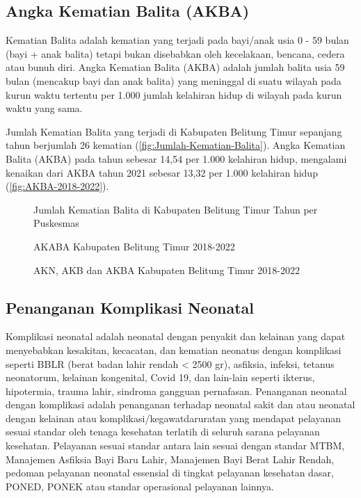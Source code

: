 \subsection{Angka Kematian Balita (AKBA)}
Kematian Balita adalah kematian yang terjadi pada bayi/anak usia 0 - 59 bulan (bayi + anak balita) tetapi bukan disebabkan oleh kecelakaan, bencana, cedera atau bunuh diri. Angka Kematian Balita (AKBA) adalah jumlah balita usia 59 bulan (mencakup bayi dan anak balita) yang meninggal di suatu wilayah pada kurun waktu tertentu
per 1.000 jumlah kelahiran hidup di wilayah pada kurun waktu yang sama.

Jumlah Kematian Balita yang terjadi di Kabupaten Belitung Timur sepanjang tahun \tP berjumlah 26 kematian (\autoref{fig:Jumlah-Kematian-Balita}). Angka Kematian Balita (AKBA) pada tahun \tP sebesar 14,54 per 1.000 kelahiran hidup, mengalami kenaikan dari AKBA tahun 2021 sebesar 13,32 per 1.000 kelahiran hidup (\autoref{fig:AKBA-2018-2022}).

\begin{figure}[H]
    \centering{}
    \caption{Jumlah Kematian Balita di Kabupaten Belitung Timur Tahun \tP per Puskesmas}
    \label{fig:Jumlah-Kematian-Balita}
\end{figure}

\begin{figure}[H]
    \centering{}
    \caption{AKABA Kabupaten Belitung Timur 2018-2022}
    \label{fig:AKBA-2018-2022}
\end{figure}

\begin{figure}[H]
    \centering{}
    \caption{AKN, AKB dan AKBA Kabupaten Belitung Timur 2018-2022}
    \label{fig:AKN-AKB-AKBA-2018-2022}
\end{figure}

\subsection{Penanganan Komplikasi Neonatal}
Komplikasi neonatal adalah neonatal dengan penyakit dan kelainan yang
dapat menyebabkan kesakitan, kecacatan, dan kematian neonatus dengan
komplikasi seperti BBLR (berat badan lahir rendah < 2500 gr), asfiksia, infeksi, tetanus neonatorum, kelainan kongenital, Covid 19, dan lain-lain
seperti ikterus, hipotermia, trauma lahir, sindroma gangguan pernafasan. Penanganan neonatal dengan komplikasi adalah
penanganan terhadap neonatal sakit dan atau neonatal dengan kelainan
atau komplikasi/kegawatdaruratan yang mendapat pelayanan sesuai standar
oleh tenaga kesehatan terlatih di seluruh sarana pelayanan kesehatan.
Pelayanan sesuai standar antara lain sesuai dengan standar MTBM, Manajemen
Asfiksia Bayi Baru Lahir, Manajemen Bayi Berat Lahir Rendah, pedoman
pelayanan neonatal essensial di tingkat pelayanan kesehatan dasar,
PONED, PONEK atau standar operasional pelayanan lainnya.

